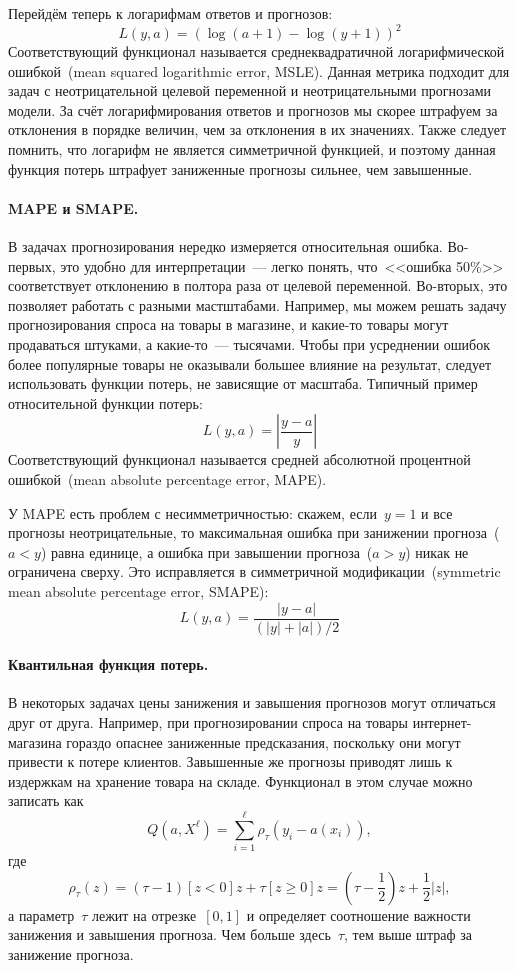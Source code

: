 \documentclass[12pt,fleqn]{article}
\begin{document}
Перейдём теперь к логарифмам ответов и прогнозов:
\[
    L(y, a) = (\log(a + 1) - \log(y + 1))^2
\]
Соответствующий функционал называется среднеквадратичной логарифмической ошибкой~(mean
squared logarithmic error, MSLE).
Данная метрика подходит для задач с неотрицательной целевой переменной и неотрицательными прогнозами модели.
За счёт логарифмирования ответов и прогнозов мы скорее штрафуем за отклонения
в порядке величин, чем за отклонения в их значениях.
Также следует помнить, что логарифм не является симметричной функцией,
и поэтому данная функция потерь штрафует заниженные прогнозы сильнее,
чем завышенные.

\paragraph{MAPE и SMAPE.}

В задачах прогнозирования нередко измеряется относительная ошибка.
Во-первых, это удобно для интерпретации~--- легко понять, что~<<ошибка 50\%>>
соответствует отклонению в полтора раза от целевой переменной.
Во-вторых, это позволяет работать с разными мастштабами.
Например, мы можем решать задачу прогнозирования спроса на товары в магазине,
и какие-то товары могут продаваться штуками, а какие-то~--- тысячами.
Чтобы при усреднении ошибок более популярные товары не оказывали
большее влияние на результат, следует использовать функции потерь, не зависящие от масштаба.
Типичный пример относительной функции потерь:
\[
    L(y, a) = \left| \frac{y - a}{y} \right|
\]
Соответствующий функционал называется средней абсолютной процентной ошибкой~(mean
absolute percentage error, MAPE).

У MAPE есть проблем с несимметричностью: скажем, если~$y = 1$ и все прогнозы неотрицательные,
то максимальная ошибка при занижении прогноза~($a < y$) равна единице, а ошибка при
завышении прогноза~($a > y$) никак не ограничена сверху.
Это исправляется в симметричной модификации~(symmetric mean absolute percentage error, SMAPE):
\[
    L(y, a) = \frac{|y - a|}{(|y| + |a|) / 2}
\]

\paragraph{Квантильная функция потерь.}

В некоторых задачах цены занижения и завышения прогнозов могут отличаться друг от друга.
Например, при прогнозировании спроса на товары интернет-магазина гораздо опаснее заниженные
предсказания, поскольку они могут привести к потере клиентов.
Завышенные же прогнозы приводят лишь к издержкам на хранение товара на складе.
Функционал в этом случае можно записать как
\[
    Q(a, X^\ell)
    =
    \sum_{i = 1}^{\ell}
        \rho_\tau(y_i - a(x_i)),
\]
где
\[
    \rho_\tau(z)
    =
    (\tau - 1) [z < 0] z
    +
    \tau [z \geq 0] z
    =
    (\tau - \frac{1}{2})z + \frac{1}{2} |z|,
\]
а параметр~$\tau$ лежит на отрезке~$[0, 1]$ и определяет
соотношение важности занижения и завышения прогноза.
Чем больше здесь~$\tau$, тем выше штраф за занижение прогноза.
\end{document}
